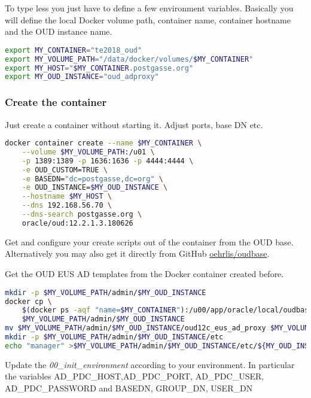 \documentclass[a4paper,,tablecaptionabove]{scrartcl}
\begin{document}
To type less you just have to define a few environment variables.
Basically you will define the local Docker volume path, container name,
container hostname and the OUD instance name.

\begin{lstlisting}[language=bash]
export MY_CONTAINER="te2018_oud"
export MY_VOLUME_PATH="/data/docker/volumes/$MY_CONTAINER"
export MY_HOST="$MY_CONTAINER.postgasse.org"
export MY_OUD_INSTANCE="oud_adproxy"
\end{lstlisting}

\hypertarget{create-the-container}{%
\subsubsection{Create the container}\label{create-the-container}}

Just create a container without starting it. Adjust ports, base DN etc.

\begin{lstlisting}[language=bash]
docker container create --name $MY_CONTAINER \
    --volume $MY_VOLUME_PATH:/u01 \
    -p 1389:1389 -p 1636:1636 -p 4444:4444 \
    -e OUD_CUSTOM=TRUE \
    -e BASEDN="dc=postgasse,dc=org" \
    -e OUD_INSTANCE=$MY_OUD_INSTANCE \
    --hostname $MY_HOST \
    --dns 192.168.56.70 \
    --dns-search postgasse.org \
    oracle/oud:12.2.1.3.180626
\end{lstlisting}

Get and configure your create scripts out of the container from the OUD
base. Alternatively you may also get it directly from GitHub
\href{https://github.com/oehrlis/oudbase}{oehrlis/oudbase}.

Get the OUD EUS AD templates from the Docker container created before.

\begin{lstlisting}[language=bash]
mkdir -p $MY_VOLUME_PATH/admin/$MY_OUD_INSTANCE
docker cp \
    $(docker ps -aqf "name=$MY_CONTAINER"):/u00/app/oracle/local/oudbase/templates/create/oud12c_eus_ad_proxy \
    $MY_VOLUME_PATH/admin/$MY_OUD_INSTANCE
mv $MY_VOLUME_PATH/admin/$MY_OUD_INSTANCE/oud12c_eus_ad_proxy $MY_VOLUME_PATH/admin/$MY_OUD_INSTANCE/create
mkdir -p $MY_VOLUME_PATH/admin/$MY_OUD_INSTANCE/etc
echo "manager" >$MY_VOLUME_PATH/admin/$MY_OUD_INSTANCE/etc/${MY_OUD_INSTANCE}_pwd.txt
\end{lstlisting}

Update the \emph{00\_init\_environment} according to your environment.
In particular the variables AD\_PDC\_HOST,AD\_PDC\_PORT, AD\_PDC\_USER,
AD\_PDC\_PASSWORD and BASEDN, GROUP\_DN, USER\_DN
\end{document}

